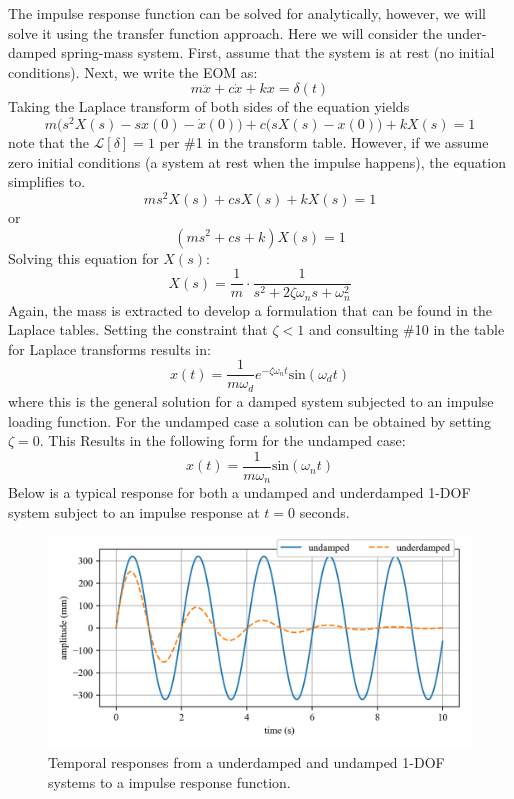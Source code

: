 \documentclass[12pt,letter]{article}
\numberwithin{ex}{section} %
\numberwithin{re}{section} %
\newcommand{\Laplace}[1]{\ensuremath{\mathcal{L}{\left[#1\right]}}}
\numberwithin{equation}{section}	%
\begin{document}
			The impulse response function can be solved for analytically, however, we will solve it using the transfer function approach. Here we will consider the under-damped spring-mass system. First, assume that the system is at rest (no initial conditions). Next, we write the EOM as:
			\begin{equation}
			m\ddot{x} +c\dot{x} +kx = \delta(t)
			\end{equation}
			Taking the Laplace transform of both sides of the equation yields 
			\begin{equation}
			m\big(s^2X(s)-sx(0) - \dot{x}(0)\big) + c\big(sX(s)-x(0)\big) +kX(s) =1
			\end{equation}
			note that the $\Laplace{\delta}=1$ per \#1 in the transform table. However, if we assume zero initial conditions (a system at rest when the impulse happens), the equation simplifies to. 
			\begin{equation}
			ms^2X(s) + csX(s) +kX(s) =1
			\end{equation}
			or
			\begin{equation}
			(ms^2 + cs +k)X(s) =1
			\end{equation}
			Solving this equation for $X(s)$:
			\begin{equation}
			X(s) = \frac{1}{m} \cdot \frac{1}{s^2 + 2 \zeta \omega_n s + \omega_n^2}
			\end{equation}
			Again, the mass is extracted to develop a formulation that can be found in the Laplace tables. Setting the constraint that $\zeta<1$ and consulting \#10 in the table for Laplace transforms results in:
			\begin{equation}
			x(t) = \frac{1}{m \omega_d} e^{-\zeta \omega_n t} \text{sin}(\omega_dt)
			\end{equation}
			where this is the general solution for a damped system subjected to an impulse loading function. For the undamped case a solution can be obtained by setting $\zeta=0$. This Results in the following form for the undamped case:
			\begin{equation}
			x(t) = \frac{1}{m \omega_n}\text{sin}(\omega_n t)
			\end{equation}
			Below is a typical response for both a undamped and underdamped 1-DOF system subject to an impulse response at $t=0$ seconds. 
			\begin{figure}[H]
				\centering
				\includegraphics[]{../figures/response_impulse.png}
				\caption{Temporal responses from a underdamped and undamped 1-DOF systems to a impulse response function.}
			\end{figure}
\end{document}
